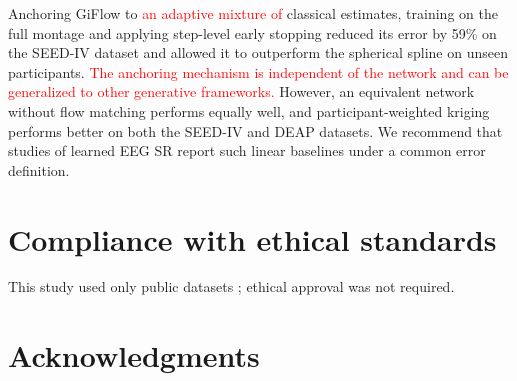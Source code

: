 \documentclass{article}
\begin{document}
Anchoring GiFlow to \textcolor{red}{an adaptive mixture of} classical estimates, training on
the full montage and applying step-level early stopping reduced its error
by 59\% on the SEED-IV dataset and allowed it to outperform the spherical
spline on unseen participants. \textcolor{red}{The anchoring mechanism is independent of
the network and can be generalized to other generative frameworks.}
However, an equivalent network without flow matching performs equally
well, and participant-weighted kriging performs better on both the SEED-IV
and DEAP datasets. We recommend that studies of learned EEG SR report such
linear baselines under a common error definition.

\section{Compliance with ethical standards}
\label{sec:ethics}

This study used only public datasets \cite{zheng2019emotionmeter,koelstra2012deap};
ethical approval was not required.

\section{Acknowledgments}
\label{sec:acknowledgments}
\end{document}
